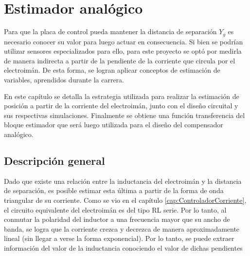 \chapter{Estimador analógico}  \label{cap:Estimador Analogico}


 Para que la placa de control pueda mantener la distancia de separación $Y_{g}$ es necesario conocer su valor  para luego actuar en consecuencia. Si bien se podrían utilizar sensores  especializados para ello, para este proyecto se optó por medirla de manera indirecta a partir de la pendiente de la corriente que circula por el electroimán. De esta forma, se logran aplicar conceptos de estimación de variables, aprendidos durante la carrera. 
 
 En este capítulo se detalla la estrategia utilizada para realizar la estimación de posición a partir de la corriente del electroimán, junto con el diseño circuital y sus respectivas simulaciones. Finalmente se obtiene una función transferencia del bloque estimador que será luego utilizada para el diseño del compensador analógico.

\section{Descripción general}


Dado que existe una relación entre la inductancia del electroimán y la distancia de separación, es posible estimar esta última a partir de la forma de onda triangular de su corriente. Como se vio en el capítulo \ref{cap:ControladorCorriente}, el circuito equivalente del electroimán es del tipo RL serie. Por lo tanto, al conmutar la polaridad del inductor a una frecuencia mayor que su ancho de banda, se logra que la corriente crezca y decrezca de manera aproximadamente lineal (sin llegar a verse la forma exponencial). Por lo tanto, se puede extraer información del valor de la inductancia conociendo el valor de dichas pendientes

